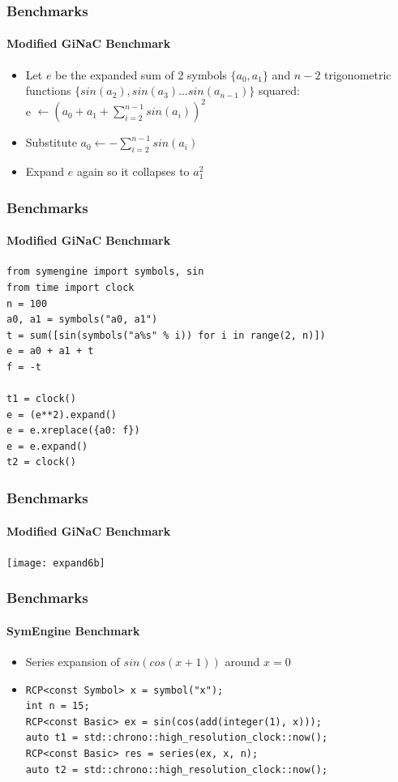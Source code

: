 \documentclass{beamer}
\begin{document}


\begin{frame}
\frametitle{Benchmarks}
\framesubtitle{Modified GiNaC Benchmark}
\begin{itemize}
\item Let $e$ be the expanded sum of 2 symbols $\{a_0, a_1\}$ and $n-2$ trigonometric functions $\{sin(a_2), sin(a_3)...sin(a_{n-1})\}$ squared:\\
e $\leftarrow (a_0+a_1+\sum_{i=2}^{n-1} sin(a_i))^2$
\item Substitute $a_0 \leftarrow -\sum_{i=2}^{n-1} sin(a_i)$
\item Expand $e$ again so it collapses to $a_1^2$
\end{itemize}
\end{frame}


\begin{frame}[fragile]
\frametitle{Benchmarks}
\framesubtitle{Modified GiNaC Benchmark}
\begin{verbatim}
from symengine import symbols, sin
from time import clock
n = 100
a0, a1 = symbols("a0, a1")
t = sum([sin(symbols("a%s" % i)) for i in range(2, n)])
e = a0 + a1 + t
f = -t

t1 = clock()
e = (e**2).expand()
e = e.xreplace({a0: f})
e = e.expand()
t2 = clock()
\end{verbatim}
\end{frame}

\begin{frame}
\frametitle{Benchmarks}
\framesubtitle{Modified GiNaC Benchmark}
\texttt{[image: expand6b]}
\end{frame}

\begin{frame}[fragile]
\frametitle{Benchmarks}
\framesubtitle{SymEngine Benchmark}
\begin{itemize}
\item Series expansion of $sin(cos(x+1))$ around $x=0$
\linebreak
\item
\begin{verbatim}
RCP<const Symbol> x = symbol("x");
int n = 15;
RCP<const Basic> ex = sin(cos(add(integer(1), x)));
auto t1 = std::chrono::high_resolution_clock::now();
RCP<const Basic> res = series(ex, x, n);
auto t2 = std::chrono::high_resolution_clock::now();
\end{verbatim}

\end{itemize}
\end{frame}
\end{document}
